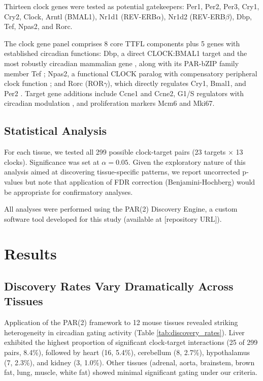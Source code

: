 \documentclass[10pt,letterpaper]{article}
\begin{document}
Thirteen clock genes were tested as potential gatekeepers: Per1, Per2, Per3, Cry1, Cry2, Clock, Arntl (BMAL1), Nr1d1 (REV-ERB$\alpha$), Nr1d2 (REV-ERB$\beta$), Dbp, Tef, Npas2, and Rorc.

The clock gene panel comprises 8 core TTFL components \citep{takahashi2017} plus 5 genes with established circadian functions: Dbp, a direct CLOCK:BMAL1 target and the most robustly circadian mammalian gene \citep{ripperger2000clock, wuarin1990dbp}, along with its PAR-bZIP family member Tef \citep{gachon2006parbzip}; Npas2, a functional CLOCK paralog with compensatory peripheral clock function \citep{reick2001npas2, debruyne2007clock}; and Rorc (ROR$\gamma$), which directly regulates Cry1, Bmal1, and Per2 \citep{takeda2012rorc}. Target gene additions include Ccne1 and Ccne2, G1/S regulators with circadian modulation \citep{siu2010cycline, farshadi2020clockcellcycle}, and proliferation markers Mcm6 and Mki67.

\subsection{Statistical Analysis}

For each tissue, we tested all 299 possible clock-target pairs (23 targets $\times$ 13 clocks). Significance was set at $\alpha = 0.05$. Given the exploratory nature of this analysis aimed at discovering tissue-specific patterns, we report uncorrected p-values but note that application of FDR correction (Benjamini-Hochberg) would be appropriate for confirmatory analyses.

All analyses were performed using the PAR(2) Discovery Engine, a custom software tool developed for this study (available at [repository URL]).

\section{Results}

\subsection{Discovery Rates Vary Dramatically Across Tissues}

Application of the PAR(2) framework to 12 mouse tissues revealed striking heterogeneity in circadian gating activity (Table \ref{tab:discovery_rates}). Liver exhibited the highest proportion of significant clock-target interactions (25 of 299 pairs, 8.4\%), followed by heart (16, 5.4\%), cerebellum (8, 2.7\%), hypothalamus (7, 2.3\%), and kidney (3, 1.0\%). Other tissues (adrenal, aorta, brainstem, brown fat, lung, muscle, white fat) showed minimal significant gating under our criteria.
\end{document}

